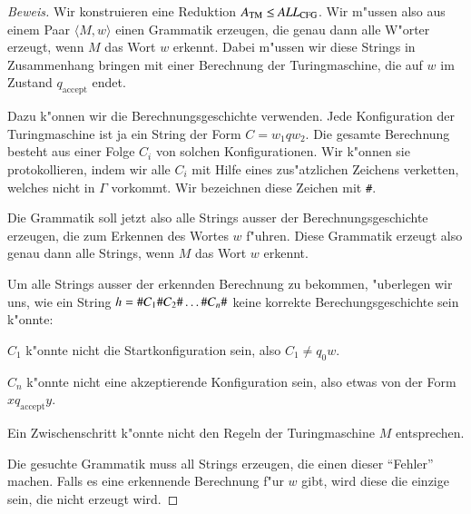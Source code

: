 \begin{proof}[Beweis]
Wir konstruieren eine Reduktion 
$A_{\text{TM}}\le \text{\it ALL}_{\text{CFG}}$.
Wir m"ussen also aus einem Paar $\langle M,w\rangle$ einen
Grammatik erzeugen, die genau dann alle W"orter erzeugt, wenn
$M$ das Wort $w$ erkennt. Dabei m"ussen wir diese Strings in
Zusammenhang bringen mit einer Berechnung der Turingmaschine, die
auf $w$ im Zustand $q_{\text{accept}}$ endet.

Dazu k"onnen wir
die Berechnungsgeschichte verwenden. Jede Konfiguration der
Turingmaschine ist ja ein String der Form $C=w_1qw_2$. Die gesamte
Berechnung besteht aus einer Folge $C_i$ von solchen Konfigurationen.
Wir k"onnen sie protokollieren, indem wir alle $C_i$
mit Hilfe eines zus"atzlichen Zeichens verketten,
welches nicht in $\Gamma$ vorkommt. Wir bezeichnen diese Zeichen
mit {\tt\#}.

Die Grammatik soll jetzt also alle Strings ausser der Berechnungsgeschichte
erzeugen, die zum Erkennen des Wortes $w$ f"uhren. Diese Grammatik
erzeugt also genau dann alle Strings, wenn $M$ das Wort $w$ erkennt.

Um alle Strings ausser der erkennden Berechnung zu bekommen,
"uberlegen wir uns, wie ein String
$h={\tt\#}C_1{\tt\#}C_2{\tt\#}\dots{\tt\#}C_n{\tt\#}$
keine korrekte Berechungsgeschichte sein k"onnte:
\medskip
\begin{compactenum}
\item $C_1$ k"onnte nicht die Startkonfiguration sein, also
$C_1\ne q_0w$.
\item $C_n$ k"onnte nicht eine akzeptierende Konfiguration 
sein, also etwas von der Form $xq_{\text{accept}}y$.
\item Ein Zwischenschritt k"onnte nicht den Regeln der Turingmaschine
$M$ entsprechen.
\end{compactenum}
\medskip
Die gesuchte Grammatik muss all Strings erzeugen, die einen dieser ``Fehler''
machen. Falls es eine erkennende Berechnung f"ur $w$ gibt, wird diese
die einzige sein, die nicht erzeugt wird.


\end{proof}
